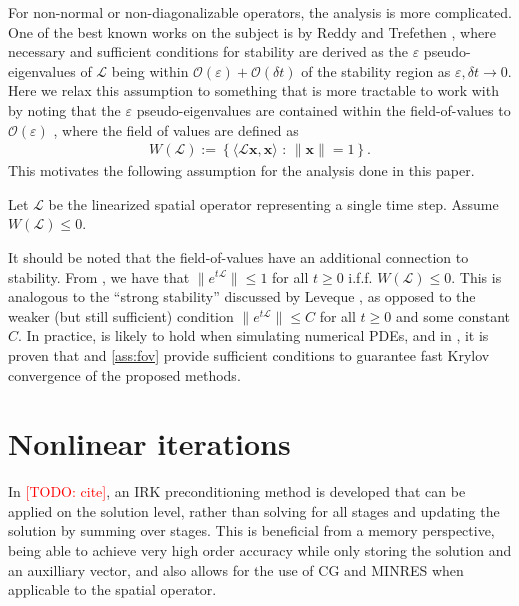 \documentclass[review]{siamart}
\makeatletter
\newcommand{\todo}[1]{\textcolor{red}{[TODO\@: #1]}}
\makeatother
\begin{document}
For non-normal or non-diagonalizable operators, the analysis is more complicated.
One of the best known works on the subject is by Reddy and Trefethen \cite{reddy92},
where necessary and sufficient conditions for stability are derived as the
$\varepsilon$ pseudo-eigenvalues of $\mathcal{L}$ being within 
$\mathcal{O}(\varepsilon) + \mathcal{O}(\delta t)$ of the stability region
as $\varepsilon,\delta t\to 0$. Here we relax this assumption to something
that is more tractable to work with by noting that the $\varepsilon$
pseudo-eigenvalues are contained within the field-of-values to
$\mathcal{O}(\varepsilon)$ \cite[Eq. (17.9)]{trefethen2005spectra},
where the field of values are defined as
%
\begin{align}\label{eq:fov}
W(\mathcal{L}) := \left\{ \langle \mathcal{L}\mathbf{x},\mathbf{x}\rangle \text{ : }
	\|\mathbf{x}\| = 1 \right\}.
\end{align}
%
This motivates the following assumption for the analysis done in this paper.
%
\begin{assumption}\label{ass:fov}
Let $\mathcal{L}$ be the linearized spatial operator representing a single
time step. Assume $W(\mathcal{L}) \leq 0$.
\end{assumption}
%
It should be noted that the field-of-values have an additional connection
to stability. From \cite[Theorem 17.1]{trefethen2005spectra}, we have that
$\|e^{t\mathcal{L}}\|\leq 1$ for all $t\geq 0$ i.f.f. $W(\mathcal{L}) \leq 0$.
This is analogous to the ``strong stability'' discussed by Leveque 
\cite[Chapter 9.5]{leveque2007finite}, as opposed to the weaker (but still
sufficient) condition $\|e^{t\mathcal{L}}\|\leq C$ for all $t\geq 0$ and
some constant $C$. In practice,  is likely to hold when
simulating numerical PDEs, and in ,
it is proven that  and \ref{ass:fov} provide sufficient conditions
to guarantee fast Krylov convergence of the proposed methods.


\section{Nonlinear iterations}\label{sec:nonlinear}

In \todo{cite}, an IRK preconditioning method is developed that can be applied on the
solution level, rather than solving for all stages and updating the solution
by summing over stages.
This is beneficial from a memory perspective, being able to achieve very
high order accuracy while only storing the solution and an auxilliary vector, and
also allows for the use of CG and MINRES when applicable to the spatial operator.
\end{document}
